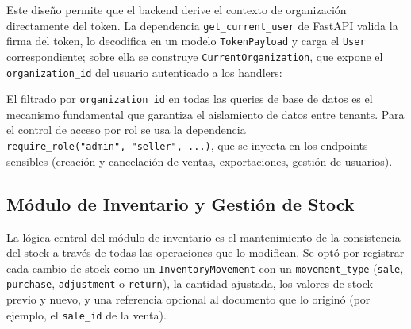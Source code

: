Este diseño permite que el backend derive el contexto de organización directamente del token. La dependencia \texttt{get\_current\_user} de FastAPI valida la firma del token, lo decodifica en un modelo \texttt{TokenPayload} y carga el \texttt{User} correspondiente; sobre ella se construye \texttt{CurrentOrganization}, que expone el \texttt{organization\_id} del usuario autenticado a los handlers:

\begin{Shaded}
\begin{Highlighting}[]
\OperatorTok{=}
\OperatorTok{=}

\NormalTok{(}\OperatorTok{=}
\NormalTok{) }\OperatorTok{{-}\textgreater{}}
\OperatorTok{=}\OperatorTok{=}\OperatorTok{=}
    \OperatorTok{=}\OperatorTok{=}
\end{Highlighting}
\end{Shaded}

El filtrado por \texttt{organization\_id} en todas las queries de base de datos es el mecanismo fundamental que garantiza el aislamiento de datos entre tenants. Para el control de acceso por rol se usa la dependencia \texttt{require\_role("admin",\ "seller",\ ...)}, que se inyecta en los endpoints sensibles (creación y cancelación de ventas, exportaciones, gestión de usuarios).

\subsection{Módulo de Inventario y Gestión de Stock}\label{muxf3dulo-de-inventario-y-gestiuxf3n-de-stock}

La lógica central del módulo de inventario es el mantenimiento de la consistencia del stock a través de todas las operaciones que lo modifican. Se optó por registrar cada cambio de stock como un \texttt{InventoryMovement} con un \texttt{movement\_type} (\texttt{sale}, \texttt{purchase}, \texttt{adjustment} o \texttt{return}), la cantidad ajustada, los valores de stock previo y nuevo, y una referencia opcional al documento que lo originó (por ejemplo, el \texttt{sale\_id} de la venta).

